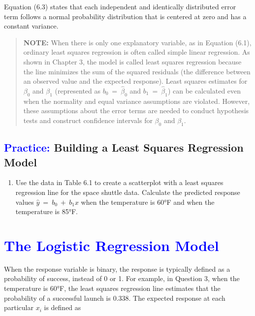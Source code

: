 \documentclass[
]{report}
\providecommand{\tightlist}{%
  \setlength{\itemsep}{0pt}\setlength{\parskip}{0pt}}
\begin{document}
Equation (6.3) states that each independent and identically distributed error term follows a normal probability
distribution that is centered at zero and has a constant variance.

\begin{quote}
\textbf{NOTE:} When there is only one explanatory variable, as in Equation (6.1), ordinary least squares regression is often called simple linear regression. As shown in Chapter 3, the model is called least squares regression because the line minimizes the sum of the squared residuals (the difference between an observed value and the expected response). Least squares estimates for \(\scriptstyle \beta_0\) and \(\scriptstyle \beta_1\) (represented as \(\scriptstyle b_0 \ =\  \hat\beta_0\) and \(\scriptstyle b_1 \ =\  \hat\beta_1\)) can be calculated even when the normality and equal variance assumptions are violated. However, these assumptions about the error terms are needed to conduct hypothesis tests and construct confidence intervals for \(\scriptstyle \beta_0\) and \(\scriptstyle \beta_1\).
\end{quote}

\hypertarget{building-a-least-squares-regression-model}{%
\subsection*{\texorpdfstring{\textcolor{blue}{Practice:} Building a Least Squares Regression Model}{ Building a Least Squares Regression Model}}\label{building-a-least-squares-regression-model}}

\begin{enumerate}
\def\labelenumi{\arabic{enumi}.}
\setcounter{enumi}{2}
\tightlist
\item
  Use the data in Table 6.1 to create a scatterplot with a least squares regression line for the space shuttle data. Calculate the predicted response values \(\scriptstyle \hat y \ =\  b_0 \ +\  b_1 x\) when the temperature is 60°F and when the temperature is 85°F.
\end{enumerate}

\hypertarget{section-62}{%
\section{\texorpdfstring{\textcolor{blue}{ The Logistic Regression Model}}{}}\label{section-62}}

When the response variable is binary, the response is typically defined as a probability of success, instead of 0 or 1. For example, in Question 3, when the temperature is 60°F, the least squares regression line estimates that the probability of a successful launch is 0.338. The expected response at each particular \(\scriptstyle x_i\) is defined as
\end{document}
